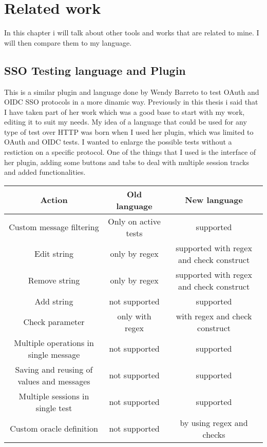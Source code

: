 \chapter{Related work}
In this chapter i will talk about other tools and works that are related to mine. I will then compare them to my language.

\section{SSO Testing language and Plugin}
This is a similar plugin and language done by Wendy Barreto \cite{wendy_barreto} to test OAuth and OIDC SSO protocols in a more dinamic way. Previously in this thesis i said that I have taken part of her work which was a good base to start with my work, editing it to suit my needs. My idea of a language that could be used for any type of test over HTTP was born when I used her plugin, which was limited to OAuth and OIDC tests. I wanted to enlarge the possible tests without a restiction on a specific protocol. One of the things that I used is the interface of her plugin, adding some buttons and tabs to deal with multiple session tracks and added functionalities.

\begin{center}
    \begin{tabular}{ |c|c|c| }
        \hline
        Action                                    & Old language         & New language                             \\
        \hline\hline
        Custom message filtering                  & Only on active tests & supported                                \\
        Edit string                               & only by regex        & supported with regex and check construct \\
        Remove string                             & only by regex        & supported with regex and check construct \\
        Add string                                & not supported        & supported                                \\
        Check parameter                           & only with regex      & with regex and check construct           \\
        Multiple operations in single message     & not supported        & supported                                \\
        Saving and reusing of values and messages & not supported        & supported                                \\
        Multiple sessions in single test          & not supported        & supported                                \\
        Custom oracle definition                  & not supported        & by using regex and checks                \\
        \hline
    \end{tabular}
\end{center}

